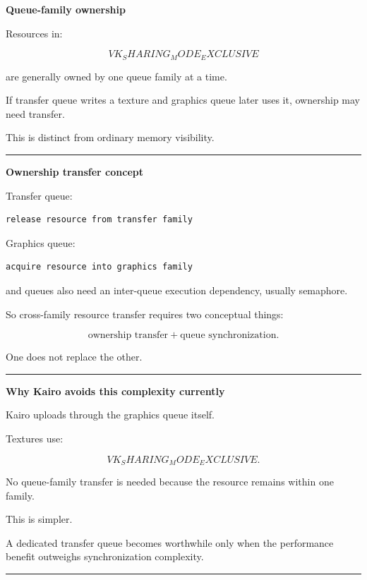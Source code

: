 \textbf{Queue-family ownership}

Resources in:

\[
VK_SHARING_MODE_EXCLUSIVE
\]

are generally owned by one queue family at a time.

If transfer queue writes a texture and graphics queue later uses it, ownership may need transfer.

This is distinct from ordinary memory visibility.

\begin{center}\rule{0.5\linewidth}{0.5pt}\end{center}

\textbf{Ownership transfer concept}

Transfer queue:

\begin{verbatim}
release resource from transfer family
\end{verbatim}

Graphics queue:

\begin{verbatim}
acquire resource into graphics family
\end{verbatim}

and queues also need an inter-queue execution dependency, usually semaphore.

So cross-family resource transfer requires two conceptual things:

\[
\boxed{
\text{ownership transfer}
+
\text{queue synchronization}.
}
\]

One does not replace the other.

\begin{center}\rule{0.5\linewidth}{0.5pt}\end{center}

\textbf{Why Kairo avoids this complexity currently}

Kairo uploads through the graphics queue itself.

Textures use:

\[
VK_SHARING_MODE_EXCLUSIVE.
\]

No queue-family transfer is needed because the resource remains within one family.

This is simpler.

A dedicated transfer queue becomes worthwhile only when the performance benefit outweighs synchronization complexity.

\begin{center}\rule{0.5\linewidth}{0.5pt}\end{center}

